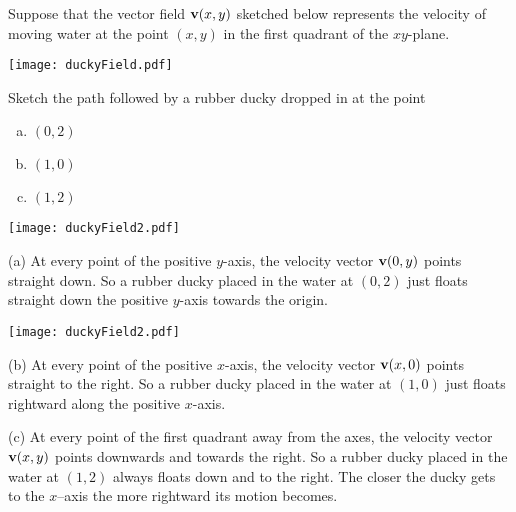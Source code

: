 



\begin{question}
Suppose that the vector field $\mathbf{v}(x,y)$ sketched below represents the velocity of 
moving water at the point $(x,y)$ in the first quadrant of the $xy$-plane.
  \begin{center}
       \texttt{[image: duckyField.pdf]}
  \end{center}
Sketch the path followed by a rubber ducky dropped in at the point
\begin{enumerate}[(a)]
\item $(0,2)$
\item $(1,0)$
\item $(1,2)$
\end{enumerate}
\end{question}


\begin{answer} 
\begin{center}
       \texttt{[image: duckyField2.pdf]}
  \end{center}
\end{answer}

\begin{solution}
(a) At every point of the positive $y$-axis, the velocity vector $\mathbf{v}(0,y)$
points straight down. So a rubber ducky placed in the water at $(0,2)$
just floats straight down the positive $y$-axis towards the origin.

\begin{center}
       \texttt{[image: duckyField2.pdf]}
  \end{center}

\noindent
(b) At every point of the positive $x$-axis, the velocity vector $\mathbf{v}(x,0)$
points straight to the right. So a rubber ducky placed in the water at $(1,0)$
just floats rightward along the positive $x$-axis.

\noindent
(c) At every point of the first quadrant away from the axes, the 
velocity vector $\mathbf{v}(x,y)$ points downwards and towards the right. So a 
rubber ducky placed in the water at $(1,2)$ always floats down and to 
the right. The closer the ducky gets to the $x$--axis the more rightward 
its motion becomes. 

\end{solution}


